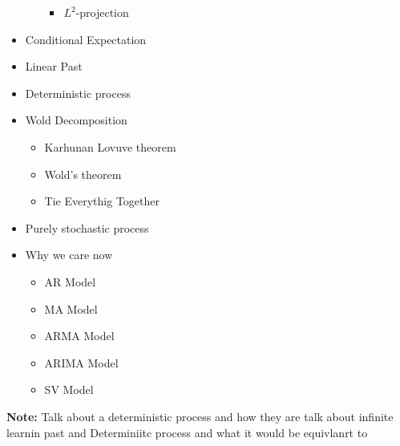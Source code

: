 \documentclass[answers,12pt,addpoints]{exam}
\begin{document}
\begin{itemize}
\begin{itemize}
\begin{itemize}
            \item $L^2$-projection
        \end{itemize}
    \end{itemize}
    \item Conditional Expectation
    \item Linear Past 
    \item Deterministic process
    \item Wold Decomposition
    \begin{itemize}
        \item Karhunan Lovuve theorem
        \item Wold's theorem
        \item Tie Everythig Together
    \end{itemize}
    \item Purely stochastic process
    \item Why we care now 
    \begin{itemize}
        \item AR Model 
        \item MA Model
        \item ARMA Model
        \item ARIMA Model
        \item SV Model
    \end{itemize}
\end{itemize}


\textbf{Note:} 
Talk about a deterministic process and how they are 
talk about infinite learnin past and Determiniitc process and what it would be equivlanrt to 
\end{document}
